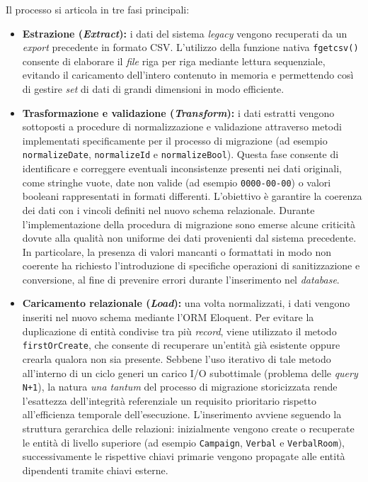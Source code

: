 Il processo si articola in tre fasi principali:
\begin{itemize}
	\item \textbf{Estrazione (\textit{Extract}):} i dati del sistema \textit{legacy} vengono recuperati da un \textit{export} precedente in formato CSV. L'utilizzo della funzione nativa \texttt{fgetcsv()} consente di elaborare il \textit{file} riga per riga mediante lettura sequenziale, evitando il caricamento dell'intero contenuto in memoria e permettendo così di gestire \textit{set} di dati di grandi dimensioni in modo efficiente.
	\item \textbf{Trasformazione e validazione (\textit{Transform}):} i dati estratti vengono sottoposti a procedure di normalizzazione e validazione attraverso metodi implementati specificamente per il processo di migrazione (ad esempio \texttt{normalizeDate}, \texttt{normalizeId} e \texttt{normalizeBool}). Questa fase consente di identificare e correggere eventuali inconsistenze presenti nei dati originali, come stringhe vuote, date non valide (ad esempio \texttt{0000-00-00}) o valori booleani rappresentati in formati differenti. L'obiettivo è garantire la coerenza dei dati con i vincoli definiti nel nuovo schema relazionale. Durante l'implementazione della procedura di migrazione sono emerse alcune criticità dovute alla qualità non uniforme dei dati provenienti dal sistema precedente. In particolare, la presenza di valori mancanti o formattati in modo non coerente ha richiesto l'introduzione di specifiche operazioni di sanitizzazione e conversione, al fine di prevenire errori durante l'inserimento nel \textit{database}.
	\item \textbf{Caricamento relazionale (\textit{Load}):} una volta normalizzati, i dati vengono inseriti nel nuovo schema mediante l'ORM Eloquent. Per evitare la duplicazione di entità condivise tra più \textit{record}, viene utilizzato il metodo \texttt{firstOrCreate}, che consente di recuperare un'entità già esistente oppure crearla qualora non sia presente. Sebbene l'uso iterativo di tale metodo all'interno di un ciclo generi un carico I/O subottimale (problema delle \textit{query} \texttt{N+1}), la natura \textit{una tantum} del processo di migrazione storicizzata rende l'esattezza dell'integrità referenziale un requisito prioritario rispetto all'efficienza temporale dell'esecuzione. L'inserimento avviene seguendo la struttura gerarchica delle relazioni: inizialmente vengono create o recuperate le entità di livello superiore (ad esempio \texttt{Campaign}, \texttt{Verbal} e \texttt{VerbalRoom}), successivamente le rispettive chiavi primarie vengono propagate alle entità dipendenti tramite chiavi esterne.
\end{itemize}
